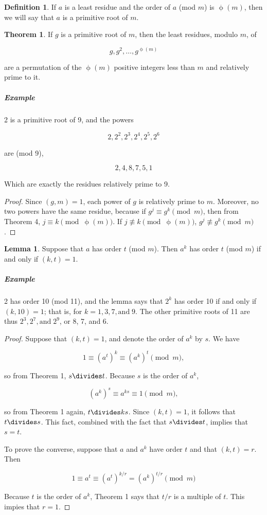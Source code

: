 \documentclass{article}
\theoremstyle{definition} %
\newtheorem{theorem}{Theorem}[section] %
\theoremstyle{definition}
\theoremstyle{definition}
\newtheorem{lemma}{Lemma}[section]
\newcommand{\tot}{\upphi}
\theoremstyle{definition}
\newtheorem{definition}{Definition}[section]
\begin{document}
  \begin{definition}
    If $a$ is a least residue and the order of $a$ (mod $m$) is $\tot(m)$, then we will say that $a$ is
    a primitive root of $m$.
  \end{definition}
  
  \begin{theorem}
    If $g$ is a primitive root of $m$, then the least residues, modulo $m$, of
    
    \[ g, g^2, \dots, g^{\tot(m)} \]
    
    are a permutation of the $\tot(m)$ positive integers less than $m$ and relatively prime to it.
  \end{theorem}
  
  \subparagraph{Example} 2 is a primitive root of 9, and the powers
  
  \[ 2, 2^2, 2^3, 2^4, 2^5, 2^6 \]
  
  are (mod 9),
  
  \[ 2, 4, 8, 7, 5, 1 \]
  
  Which are exactly the residues relatively prime to 9.
  
  \begin{proof}
    Since $(g, m) = 1$, each power of $g$ is relatively prime to $m$. Moreover, no two powers
    have the same residue, because if $g^j \equiv g^k \pmod{m}$, then from Theorem 4,
    $j \equiv k \pmod{\tot(m)}$. If $j \nequiv k \pmod{\tot(m)}$, $g^j \nequiv g^k \pmod{m}$.
  \end{proof}
  
  \begin{lemma}
    Suppose that $a$ has order $t$ (mod $m$). Then $a^k$ has order $t$ (mod $m$) if and
    only if $(k, t) = 1$.
  \end{lemma}
  
  \subparagraph{Example} 2 has order 10 (mod 11), and the lemma says that $2^k$ has order
  10 if and only if $(k, 10) = 1$; that is, for $k = 1, 3, 7, \text{and}\;9$. The other primitive roots of 11
  are thus $2^3, 2^7, \text{and}\; 2^9$, or 8, 7, and 6.
  
  \begin{proof}
    Suppose that $(k, t) = 1$, and denote the order of $a^k$ by $s$. We have
    
    \[ 1 \equiv (a^t)^k \equiv (a^k)^t \pmod{m}, \]
    
    so from Theorem 1, $s \divides t$. Because $s$ is the order of $a^k$,
    
    \[ (a^k)^s \equiv a^{ks} \equiv 1 \pmod{m}, \]
    
    so from Theorem 1 again, $t \divides ks$. Since $(k, t) = 1$, it follows that
    $t \divides s$. This fact, combined with the fact that $s \divides t$, implies that
    $s = t$.
    
    To prove the converse, suppose that $a$ and $a^k$ have order $t$ and
    that $(k, t) = r$. Then
    
    \[ 1 \equiv a^t \equiv (a^t)^{k / r} = (a^k)^{t / r} \pmod{m} \]
    
    Because $t$ is the order of $a^k$, Theorem 1 says that $t/r$ is
    a multiple of $t$. This impies that $r = 1$.
  \end{proof}
  
\end{document}
